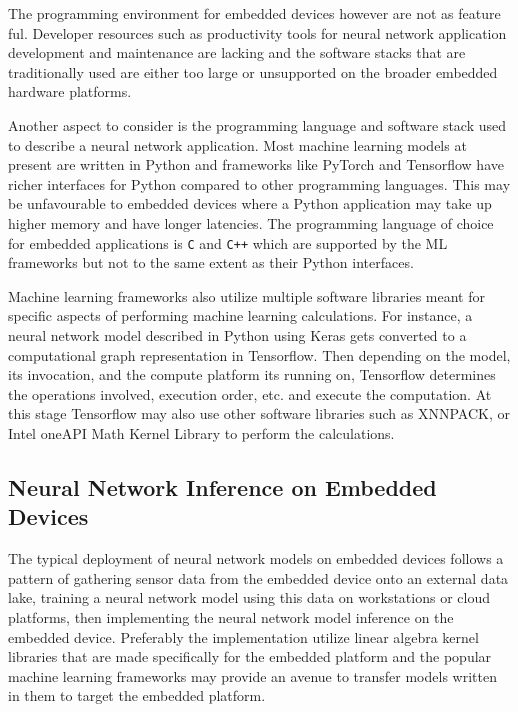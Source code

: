 
The programming environment for embedded devices however are not as feature ful. Developer resources such as productivity tools for neural network application development and maintenance are lacking and the software stacks that are traditionally used are either too large or unsupported on the broader embedded hardware platforms.

Another aspect to consider is the programming language and software stack used to describe a neural network application. Most machine learning models at present are written in Python and frameworks like PyTorch and Tensorflow have richer interfaces for Python compared to other programming languages. This may be unfavourable to embedded devices where a Python application may take up higher memory and have longer latencies. The programming language of choice for embedded applications is \texttt{C} and \texttt{C++} which are supported by the ML frameworks but not to the same extent as their Python interfaces.

Machine learning frameworks also utilize multiple software libraries meant for specific aspects of performing machine learning calculations. For instance, a neural network model described in Python using Keras gets converted to a computational graph representation in Tensorflow. Then depending on the model, its invocation, and the compute platform its running on, Tensorflow determines the operations involved, execution order, etc. and execute the computation. At this stage Tensorflow may also use other software libraries such as XNNPACK, or Intel oneAPI Math Kernel Library to perform the calculations.


\subsection{Neural Network Inference on Embedded Devices}

The typical deployment of neural network models on embedded devices follows a pattern of gathering sensor data from the embedded device onto an external data lake, training a neural network model using this data on workstations or cloud platforms, then implementing the neural network model inference on the embedded device. Preferably the implementation utilize linear algebra kernel libraries that are made specifically for the embedded platform and the popular machine learning frameworks may provide an avenue to transfer models written in them to target the embedded platform.

